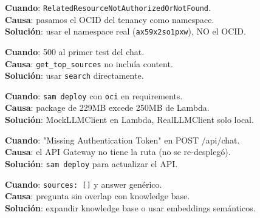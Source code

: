 \documentclass[11pt,a4paper,oneside]{article}
\begin{document}
\begin{tcolorbox}[colback=errred!5!white,colframe=errred,breakable,title={Error 1: Namespace mismatch}]
\textbf{Cuando}: \texttt{RelatedResourceNotAuthorizedOrNotFound}. \\
\textbf{Causa}: pasamos el OCID del tenancy como namespace. \\
\textbf{Soluci\'on}: usar el namespace real (\texttt{ax59x2so1pxw}), NO el OCID.
\end{tcolorbox}

\begin{tcolorbox}[colback=errred!5!white,colframe=errred,breakable,title={Error 2: KeyError 'content' en chat}]
\textbf{Cuando}: 500 al primer test del chat. \\
\textbf{Causa}: \texttt{get\_top\_sources} no inclu\'ia content. \\
\textbf{Soluci\'on}: usar \texttt{search} directamente.
\end{tcolorbox}

\begin{tcolorbox}[colback=errred!5!white,colframe=errred,breakable,title={Error 3: 502 al deployar con oci package}]
\textbf{Cuando}: \texttt{sam deploy} con \texttt{oci} en requirements. \\
\textbf{Causa}: package de 229MB excede 250MB de Lambda. \\
\textbf{Soluci\'on}: MockLLMClient en Lambda, RealLLMClient solo local.
\end{tcolorbox}

\begin{tcolorbox}[colback=errred!5!white,colframe=errred,breakable,title={Error 4: chat endpoint 404}]
\textbf{Cuando}: "Missing Authentication Token" en POST /api/chat. \\
\textbf{Causa}: el API Gateway no tiene la ruta (no se re-despleg\'o). \\
\textbf{Soluci\'on}: \texttt{sam deploy} para actualizar el API.
\end{tcolorbox}

\begin{tcolorbox}[colback=errred!5!white,colframe=errred,breakable,title={Error 5: No encuentra fuentes relevantes}]
\textbf{Cuando}: \texttt{sources: []} y answer gen\'erico. \\
\textbf{Causa}: pregunta sin overlap con knowledge base. \\
\textbf{Soluci\'on}: expandir knowledge base o usar embeddings sem\'anticos.
\end{tcolorbox}
\end{document}
